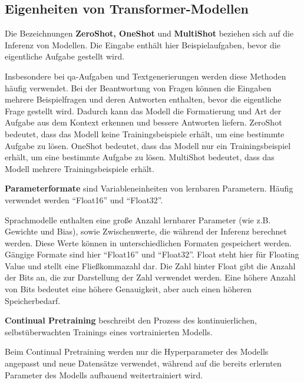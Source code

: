 \subsection{Eigenheiten von Transformer-Modellen}
\begin{definition}\label{def:zeroshot-oneshot-multishot}
    Die Bezeichnungen \textbf{ZeroShot, OneShot} und \textbf{MultiShot} beziehen sich auf die Inferenz von Modellen.
    Die Eingabe enthält hier Beispielaufgaben, bevor die eigentliche Aufgabe gestellt wird.
\end{definition}
Insbesondere bei \ac{qa}-Aufgaben und Textgenerierungen werden diese Methoden häufig verwendet.
Bei der Beantwortung von Fragen können die Eingaben mehrere Beispielfragen und deren Antworten enthalten, bevor die eigentliche Frage gestellt wird.
Dadurch kann das Modell die Formatierung und Art der Aufgabe aus dem Kontext erkennen und bessere Antworten liefern.
\mbox{ZeroShot} bedeutet, dass das Modell keine Trainingsbeispiele erhält, um eine bestimmte Aufgabe zu lösen.
OneShot bedeutet, dass das Modell nur ein Trainingsbeispiel erhält, um eine bestimmte Aufgabe zu lösen.
MultiShot bedeutet, dass das Modell mehrere Trainingsbeispiele erhält.


\begin{definition}\label{def:parameterformate}
    \textbf{Parameterformate} sind Variableneinheiten von lernbaren Parametern.
    Häufig verwendet werden \enquote{Float16} und \enquote{Float32}.
\end{definition}
Sprachmodelle enthalten eine große Anzahl lernbarer Parameter (wie z.B. Gewichte und Bias),
sowie Zwischenwerte, die während der Inferenz berechnet werden.
Diese Werte können in unterschiedlichen Formaten gespeichert werden.
Gängige Formate sind hier \enquote{Float16} und \enquote{Float32}.
Float steht hier für Floating Value und stellt eine Fließkommazahl dar.
Die Zahl hinter Float gibt die Anzahl der Bits an, die zur Darstellung der Zahl verwendet werden.
Eine höhere Anzahl von Bits bedeutet eine höhere Genauigkeit, aber auch einen höheren Speicherbedarf.

\begin{definition}\label{def:continual-pretraining}
    \textbf{Continual Pretraining} beschreibt den Prozess des kontinuierlichen, selbstüberwachten Trainings eines vortrainierten Modells.
\end{definition}
Beim Continual Pretraining werden nur die Hyperparameter des Modells angepasst und neue Datensätze verwendet, während auf die bereits erlernten Parameter des Modells aufbauend weitertrainiert wird.

